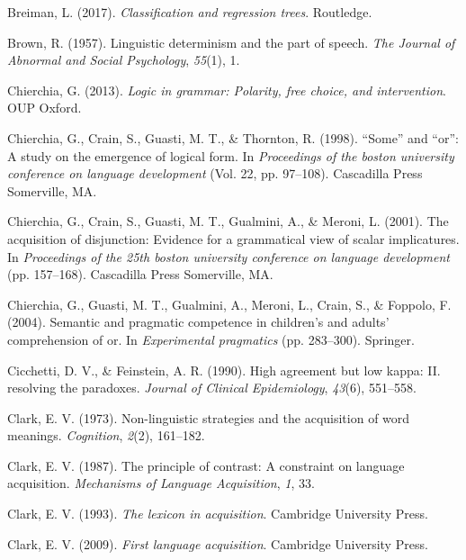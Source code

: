 \documentclass[oneside]{report}
\theoremstyle{definition}
\theoremstyle{definition}
\theoremstyle{definition}
\theoremstyle{remark}
\begin{document}
\hypertarget{ref-breiman2017classification}{}
Breiman, L. (2017). \emph{Classification and regression trees}.
Routledge.

\hypertarget{ref-brown1957linguistic}{}
Brown, R. (1957). Linguistic determinism and the part of speech.
\emph{The Journal of Abnormal and Social Psychology}, \emph{55}(1), 1.

\hypertarget{ref-chierchia2013logic}{}
Chierchia, G. (2013). \emph{Logic in grammar: Polarity, free choice, and
intervention}. OUP Oxford.

\hypertarget{ref-chierchia1998some}{}
Chierchia, G., Crain, S., Guasti, M. T., \& Thornton, R. (1998).
``Some'' and ``or'': A study on the emergence of logical form. In
\emph{Proceedings of the boston university conference on language
development} (Vol. 22, pp. 97--108). Cascadilla Press Somerville, MA.

\hypertarget{ref-chierchia2001acquisition}{}
Chierchia, G., Crain, S., Guasti, M. T., Gualmini, A., \& Meroni, L.
(2001). The acquisition of disjunction: Evidence for a grammatical view
of scalar implicatures. In \emph{Proceedings of the 25th boston
university conference on language development} (pp. 157--168).
Cascadilla Press Somerville, MA.

\hypertarget{ref-chierchia2004semantic}{}
Chierchia, G., Guasti, M. T., Gualmini, A., Meroni, L., Crain, S., \&
Foppolo, F. (2004). Semantic and pragmatic competence in children's and
adults' comprehension of or. In \emph{Experimental pragmatics} (pp.
283--300). Springer.

\hypertarget{ref-cicchetti1990high}{}
Cicchetti, D. V., \& Feinstein, A. R. (1990). High agreement but low
kappa: II. resolving the paradoxes. \emph{Journal of Clinical
Epidemiology}, \emph{43}(6), 551--558.

\hypertarget{ref-clark1973non}{}
Clark, E. V. (1973). Non-linguistic strategies and the acquisition of
word meanings. \emph{Cognition}, \emph{2}(2), 161--182.

\hypertarget{ref-clark1987principle}{}
Clark, E. V. (1987). The principle of contrast: A constraint on language
acquisition. \emph{Mechanisms of Language Acquisition}, \emph{1}, 33.

\hypertarget{ref-clark1993lexicon}{}
Clark, E. V. (1993). \emph{The lexicon in acquisition}. Cambridge
University Press.

\hypertarget{ref-clark2009first}{}
Clark, E. V. (2009). \emph{First language acquisition}. Cambridge
University Press.
\end{document}
